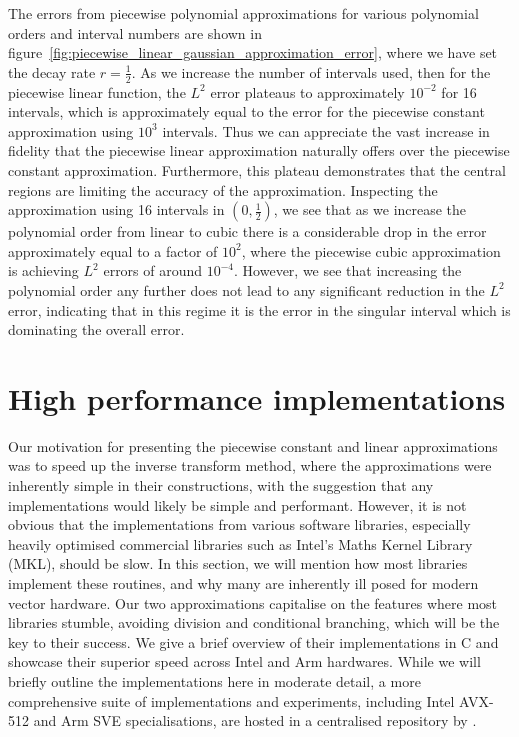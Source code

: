 \documentclass[9pt,a4paper,english]{extarticle}
\begin{document}
The errors from piecewise polynomial approximations for various polynomial orders and interval numbers are shown in figure~\ref{fig:piecewise_linear_gaussian_approximation_error}, where we have set the decay rate $ r = \tfrac{1}{2} $. As we increase the number of intervals used, then for the piecewise linear function, the $ L^2 $ error plateaus to approximately $ 10^{-2} $ for 16 intervals, which is approximately equal to the error for the piecewise constant approximation using $ 10^3 $ intervals. Thus we can appreciate the vast increase in fidelity that the piecewise linear approximation naturally offers over the piecewise constant approximation. Furthermore, this plateau demonstrates that the central regions are limiting the accuracy of the approximation. Inspecting the approximation using 16 intervals in $ (0, \tfrac{1}{2}) $, we see that as we increase the polynomial order from linear to cubic there is a considerable drop in the error approximately equal to a factor of $ 10^2 $, where the piecewise cubic approximation is achieving $ L^2 $ errors of around $ 10^{-4} $. However, we see that increasing the polynomial order any further does not lead to any significant reduction in the $ L^2 $ error, indicating that in this regime it is the error in the singular interval which is dominating the overall error. 

\section{High performance implementations}
\label{sec:high_performance_impementations}

Our motivation for presenting the piecewise constant and linear approximations was to speed up the inverse transform method, where the approximations were inherently simple in their constructions, with the suggestion that any implementations would likely be simple and performant. However, it is not obvious that the implementations from various software libraries, especially heavily optimised commercial libraries such as Intel's Maths Kernel Library (MKL), should be slow. In this section, we will mention how most libraries implement these routines, and why many are inherently ill posed for modern vector hardware. Our two approximations capitalise on the features where most libraries stumble, avoiding division and conditional branching, which will be the key to their success. We give a brief overview of their implementations in C and showcase their superior speed across Intel and Arm hardwares. While we will briefly outline the implementations here in moderate detail, a more comprehensive suite of implementations and experiments, including Intel AVX-512 and Arm SVE specialisations, are hosted in a centralised repository by \citet{sheridan2020approximate_random}.
\end{document}

